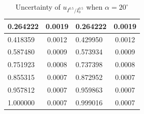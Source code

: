 \documentclass[12pt, a4paper]{article}
\begin{document}
\begin{table}[H]
\begin{tabular}{|l|cl|l|cl|}
	0.264222        & \multicolumn{2}{c|}{0.0019}                                & 0.264222        & \multicolumn{2}{c|}{0.0019}                                \\ \hline
	0.418359        & \multicolumn{2}{c|}{0.0012}                                & 0.429950        & \multicolumn{2}{c|}{0.0012}                                \\ \hline
	0.587480        & \multicolumn{2}{c|}{0.0009}                                & 0.573934        & \multicolumn{2}{c|}{0.0009}                                \\ \hline
	0.751923        & \multicolumn{2}{c|}{0.0008}                                & 0.737398        & \multicolumn{2}{c|}{0.0008}                                \\ \hline
	0.855315        & \multicolumn{2}{c|}{0.0007}                                & 0.872952        & \multicolumn{2}{c|}{0.0007}                                \\ \hline
	0.957812        & \multicolumn{2}{c|}{0.0007}                                & 0.959863        & \multicolumn{2}{c|}{0.0007}                                \\ \hline
	1.000000        & \multicolumn{2}{c|}{0.0007}                                & 0.999016        & \multicolumn{2}{c|}{0.0007}                                \\ \hline
	\end{tabular}
	\caption{Uncertainty of $u_{I^{0.5} / I^{0.5}_{0}}$ when $\alpha = 20^{\circ}$}
	\label{tab-4}
	\end{table}
	
\end{document}

